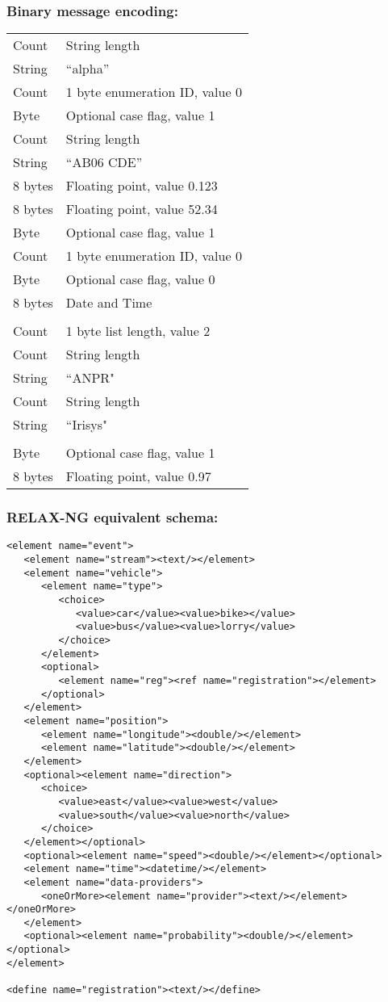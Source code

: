 \documentclass[12pt,a4paper,twoside]{article}
\renewcommand{\_}{\texttt{\symbol{95}}}
\begin{document}
\subsubsection*{Binary message encoding:}

\begin{tabular}{ll}
Count & String length\\
String & ``alpha''\\
Count & 1 byte enumeration ID, value 0\\
Byte & Optional case flag, value 1\\
Count & String length\\
String & ``AB06 CDE''\\
8 bytes & Floating point, value 0.123\\
8 bytes & Floating point, value 52.34\\
Byte & Optional case flag, value 1\\
Count & 1 byte enumeration ID, value 0\\
Byte & Optional case flag, value 0\\
8 bytes & Date and Time\\
& \\
Count & 1 byte list length, value 2\\
Count & String length\\
String & ``ANPR"\\
Count & String length\\
String & ``Irisys"\\
& \\
Byte & Optional case flag, value 1\\
8 bytes & Floating point, value 0.97\\
\end{tabular}

\subsubsection*{RELAX-NG equivalent schema:}

\begin{verbatim}
<element name="event">
   <element name="stream"><text/></element>
   <element name="vehicle">
      <element name="type">
         <choice>
            <value>car</value><value>bike></value>
            <value>bus</value><value>lorry</value>
         </choice>
      </element>
      <optional>
         <element name="reg"><ref name="registration"></element>
      </optional>
   </element>
   <element name="position">
      <element name="longitude"><double/></element>
      <element name="latitude"><double/></element>
   </element>
   <optional><element name="direction">
      <choice>
         <value>east</value><value>west</value>
         <value>south</value><value>north</value>
      </choice>
   </element></optional>
   <optional><element name="speed"><double/></element></optional>
   <element name="time"><datetime/></element>
   <element name="data-providers">
      <oneOrMore><element name="provider"><text/></element></oneOrMore>
   </element>
   <optional><element name="probability"><double/></element></optional>
</element>

<define name="registration"><text/></define>
\end{verbatim}
\end{document}
